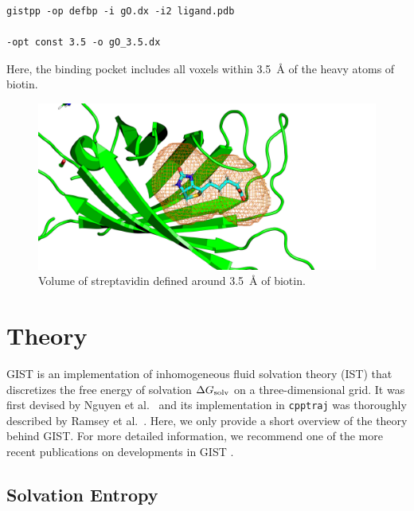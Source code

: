 \documentclass[9pt,tutorial]{livecoms}
\newcommand{\dgsolv}{\Delta G_\textup{solv}}
\newcommand{\software}{\texttt}
\begin{document}
\begin{lstlisting}[style=bash]
gistpp -op defbp -i gO.dx -i2 ligand.pdb 

-opt const 3.5 -o gO_3.5.dx
\end{lstlisting}

Here, the binding pocket includes all voxels within \SI{3.5}{\angstrom} of the heavy atoms of biotin. 

\begin{figure}
	\centering
	\includegraphics[width=1.0\linewidth]{streptavidin_bp_close.png}
	\caption{Volume of streptavidin defined around \SI{3.5}{\angstrom} of biotin. }\label{streptavidin_volume}
\end{figure}

\section{Theory}
\label{sec:theory}
GIST is an implementation of inhomogeneous fluid solvation theory (IST) \cite{Lazaridis1998} that discretizes the free energy of solvation $\dgsolv$ on a three-dimensional grid. 
It was first devised by Nguyen et al.\ \cite{Nguyen2012} and its implementation in \software{cpptraj} was thoroughly described by Ramsey et al.\ \cite{Ramsey2016}.
Here, we only provide a short overview of the theory behind GIST.
For more detailed information, we recommend one of the more recent publications on developments in GIST \cite{Kraml2020,Chen2021}.

\subsection{Solvation Entropy}
\end{document}
